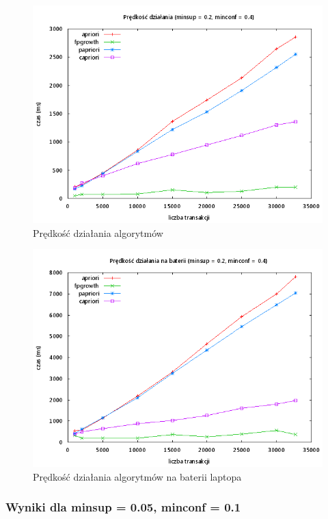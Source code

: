 \begin{figure}[ht]
\centering
\includegraphics[width=1.1\textwidth]{figures/06/02_04.png}
\caption{Prędkość działania algorytmów}
\end{figure}

\begin{figure}[ht]
\centering
\includegraphics[width=1.1\textwidth]{figures/06/02_04_bat.png}
\caption{Prędkość działania algorytmów na baterii laptopa}
\end{figure}

\subsubsection{Wyniki dla minsup = 0.05, minconf = 0.1}

